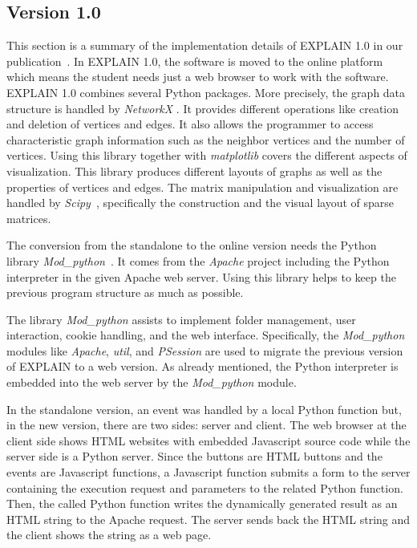\documentclass[12pt, twoside,a4paper,toc=bibliography]{scrbook}
\begin{document}
\subsection{Version 1.0}
\label{s.impl.explain1}
This section is a summary of the implementation details
of EXPLAIN 1.0 in our publication~\cite{2013:05}.
In EXPLAIN 1.0, the software is moved to the online platform which means the student needs just a web browser to work with the software.
EXPLAIN 1.0 combines several Python packages. More precisely, the graph data structure is handled by \textit{NetworkX} \cite{networkx2008}. It provides different operations like creation and deletion of vertices and edges. It also allows the programmer to access characteristic graph information such as the neighbor vertices and the number of vertices. Using this library together with \textit{matplotlib} \cite{matplotlib2007} covers the different aspects of visualization. This library produces different layouts of graphs as well as the properties of vertices and edges. The matrix manipulation and visualization are handled by \textit{Scipy}~\cite{scipy2001}, specifically the construction and the visual layout of sparse matrices.

The conversion from the standalone to the online version needs the Python library \textit{Mod\_python}~\cite{modpython2013}. It comes from the \textit{Apache} project including the Python interpreter in the given Apache web server. Using this library helps to keep the previous program structure as much as possible.

The library \textit{Mod\_python} assists to implement folder management, user interaction, cookie handling, and the web interface. Specifically, the \textit{Mod\_python} modules like \textit{Apache}, \textit{util}, and \textit{PSession} are used to migrate the previous version of \mbox{EXPLAIN} to a web version. As already mentioned, the Python interpreter is embedded into the web server by the \textit{Mod\_python} module.

In the standalone version, an event was handled by a local Python function but, in the new version, there are two sides: server and client. The web browser at the client side shows HTML websites with embedded Javascript source code while the server side is a Python server. Since the buttons are HTML buttons and the events are Javascript functions, a Javascript function submits a form to the server containing the execution request and parameters to the related Python function. Then, the called Python function writes the dynamically generated result as an HTML string to the Apache request. The server sends back the HTML string and the client shows the string as a web
page.
\end{document}
